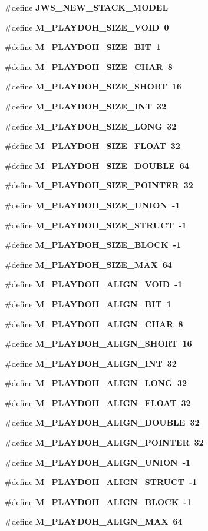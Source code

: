 \begin{CompactItemize}
\item 
\#define \bf{JWS\_\-NEW\_\-STACK\_\-MODEL}
\item 
\#define \bf{M\_\-PLAYDOH\_\-SIZE\_\-VOID}~0
\item 
\#define \bf{M\_\-PLAYDOH\_\-SIZE\_\-BIT}~1
\item 
\#define \bf{M\_\-PLAYDOH\_\-SIZE\_\-CHAR}~8
\item 
\#define \bf{M\_\-PLAYDOH\_\-SIZE\_\-SHORT}~16
\item 
\#define \bf{M\_\-PLAYDOH\_\-SIZE\_\-INT}~32
\item 
\#define \bf{M\_\-PLAYDOH\_\-SIZE\_\-LONG}~32
\item 
\#define \bf{M\_\-PLAYDOH\_\-SIZE\_\-FLOAT}~32
\item 
\#define \bf{M\_\-PLAYDOH\_\-SIZE\_\-DOUBLE}~64
\item 
\#define \bf{M\_\-PLAYDOH\_\-SIZE\_\-POINTER}~32
\item 
\#define \bf{M\_\-PLAYDOH\_\-SIZE\_\-UNION}~-1
\item 
\#define \bf{M\_\-PLAYDOH\_\-SIZE\_\-STRUCT}~-1
\item 
\#define \bf{M\_\-PLAYDOH\_\-SIZE\_\-BLOCK}~-1
\item 
\#define \bf{M\_\-PLAYDOH\_\-SIZE\_\-MAX}~64
\item 
\#define \bf{M\_\-PLAYDOH\_\-ALIGN\_\-VOID}~-1
\item 
\#define \bf{M\_\-PLAYDOH\_\-ALIGN\_\-BIT}~1
\item 
\#define \bf{M\_\-PLAYDOH\_\-ALIGN\_\-CHAR}~8
\item 
\#define \bf{M\_\-PLAYDOH\_\-ALIGN\_\-SHORT}~16
\item 
\#define \bf{M\_\-PLAYDOH\_\-ALIGN\_\-INT}~32
\item 
\#define \bf{M\_\-PLAYDOH\_\-ALIGN\_\-LONG}~32
\item 
\#define \bf{M\_\-PLAYDOH\_\-ALIGN\_\-FLOAT}~32
\item 
\#define \bf{M\_\-PLAYDOH\_\-ALIGN\_\-DOUBLE}~32
\item 
\#define \bf{M\_\-PLAYDOH\_\-ALIGN\_\-POINTER}~32
\item 
\#define \bf{M\_\-PLAYDOH\_\-ALIGN\_\-UNION}~-1
\item 
\#define \bf{M\_\-PLAYDOH\_\-ALIGN\_\-STRUCT}~-1
\item 
\#define \bf{M\_\-PLAYDOH\_\-ALIGN\_\-BLOCK}~-1
\item 
\#define \bf{M\_\-PLAYDOH\_\-ALIGN\_\-MAX}~64
\item 

\end{CompactItemize}
